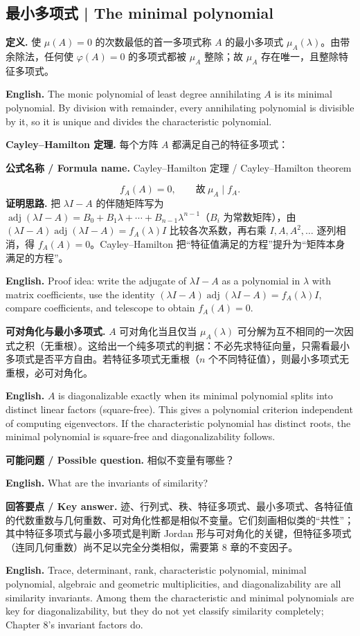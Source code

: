 \documentclass[UTF8,11pt,a4paper]{ctexart}
\newcommand{\EN}[1]{\par\noindent\textbf{English.} #1\par}
\newcommand{\FORMULA}[2]{\par\noindent\textbf{公式名称 / Formula name.} #1 / #2\par}
\newcommand{\ASK}[4]{\par\noindent\textbf{可能问题 / Possible question.} #1\par\EN{#2}\noindent\textbf{回答要点 / Key answer.} #3\par\EN{#4}\medskip}
\begin{document}
\subsection{最小多项式 | The minimal polynomial}
\noindent\textbf{定义.} 使 $\mu(A)=0$ 的次数最低的首一多项式称 $A$ 的最小多项式 $\mu_A(\lambda)$。由带余除法，任何使 $\varphi(A)=0$ 的多项式都被 $\mu_A$ 整除；故 $\mu_A$ 存在唯一，且整除特征多项式。
\EN{The monic polynomial of least degree annihilating $A$ is its minimal polynomial. By division with remainder, every annihilating polynomial is divisible by it, so it is unique and divides the characteristic polynomial.}
\noindent\textbf{Cayley--Hamilton 定理.} 每个方阵 $A$ 都满足自己的特征多项式：
\FORMULA{Cayley--Hamilton 定理}{Cayley--Hamilton theorem}
\[
f_A(A)=0,\qquad \text{故}\ \mu_A\mid f_A.
\]
\noindent\textbf{证明思路.} 把 $\lambda I-A$ 的伴随矩阵写为 $\operatorname{adj}(\lambda I-A)=B_0+B_1\lambda+\cdots+B_{n-1}\lambda^{n-1}$（$B_i$ 为常数矩阵），由 $(\lambda I-A)\operatorname{adj}(\lambda I-A)=f_A(\lambda)I$ 比较各次系数，再右乘 $I,A,A^2,\dots$ 逐列相消，得 $f_A(A)=0$。Cayley--Hamilton 把“特征值满足的方程”提升为“矩阵本身满足的方程”。
\EN{Proof idea: write the adjugate of $\lambda I-A$ as a polynomial in $\lambda$ with matrix coefficients, use the identity $(\lambda I-A)\operatorname{adj}(\lambda I-A)=f_A(\lambda)I$, compare coefficients, and telescope to obtain $f_A(A)=0$.}
\noindent\textbf{可对角化与最小多项式.} $A$ 可对角化当且仅当 $\mu_A(\lambda)$ 可分解为互不相同的一次因式之积（无重根）。这给出一个纯多项式的判据：不必先求特征向量，只需看最小多项式是否平方自由。若特征多项式无重根（$n$ 个不同特征值），则最小多项式无重根，必可对角化。
\EN{$A$ is diagonalizable exactly when its minimal polynomial splits into distinct linear factors (square-free). This gives a polynomial criterion independent of computing eigenvectors. If the characteristic polynomial has distinct roots, the minimal polynomial is square-free and diagonalizability follows.}
\ASK{相似不变量有哪些？}{What are the invariants of similarity?}{迹、行列式、秩、特征多项式、最小多项式、各特征值的代数重数与几何重数、可对角化性都是相似不变量。它们刻画相似类的“共性”；其中特征多项式与最小多项式是判断 Jordan 形与可对角化的关键，但特征多项式（连同几何重数）尚不足以完全分类相似，需要第 8 章的不变因子。}{Trace, determinant, rank, characteristic polynomial, minimal polynomial, algebraic and geometric multiplicities, and diagonalizability are all similarity invariants. Among them the characteristic and minimal polynomials are key for diagonalizability, but they do not yet classify similarity completely; Chapter 8's invariant factors do.}
\end{document}
